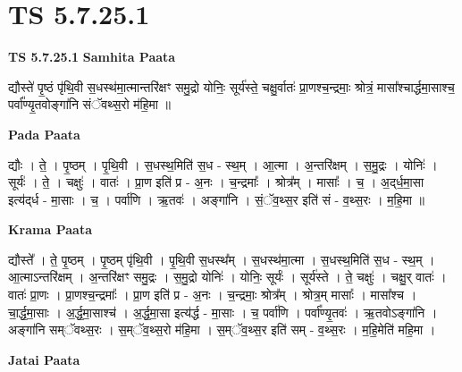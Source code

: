 \documentclass[17pt]{extarticle}
\begin{document}
\section{ TS 5.7.25.1 }

\textbf{TS 5.7.25.1 } \newline
\textbf{Samhita Paata} \newline

द्यौस्ते॑ पृ॒ष्ठं पृ॑थि॒वी स॒धस्थ॑मा॒त्मान्तरि॑क्षꣳ समु॒द्रो योनिः॒ सूर्य॑स्ते॒ चक्षु॒र्वातः॑ प्रा॒णश्च॒न्द्रमाः॒ श्रोत्रं॒ मासा᳚श्चार्द्धमा॒साश्च॒ पर्वा᳚ण्यृ॒तवोङ्गा॑नि संॅवथ्स॒रो म॑हि॒मा ॥ \newline

\textbf{Pada Paata} \newline

द्यौः । ते॒ । पृ॒ष्ठम् । पृ॒थि॒वी । स॒धस्थ॒मिति॑ स॒ध - स्थ॒म् । आ॒त्मा । अ॒न्तरि॑क्षम् । स॒मु॒द्रः । योनिः॑ । सूर्यः॑ । ते॒ । चक्षुः॑ । वातः॑ । प्रा॒ण इति॑ प्र - अ॒नः । च॒न्द्रमाः᳚ । श्रोत्र᳚म् । मासाः᳚ । च॒ । अ॒द्‌र्ध॒मा॒सा इत्य॑द्‌र्ध - मा॒साः । च॒ । पर्वा॑णि । ऋ॒तवः॑ । अङ्गा॑नि । सं॒ॅव॒थ्स॒र इति॑ सं - व॒थ्स॒रः । म॒हि॒मा ॥  \newline


\textbf{Krama Paata} \newline

द्यौस्ते᳚ । ते॒ पृ॒ष्ठम् । पृ॒ष्ठम् पृ॑थि॒वी । पृ॒थि॒वी स॒धस्थ᳚म् । स॒धस्थ॑मा॒त्मा । स॒धस्थ॒मिति॑ स॒ध - स्थ॒म् । आ॒त्माऽन्तरि॑क्षम् । अ॒न्तरि॑क्षꣳ समु॒द्रः । स॒मु॒द्रो योनिः॑ । योनिः॒ सूर्यः॑ । सूर्य॑स्ते । ते॒ चक्षुः॑ । चक्षु॒र् वातः॑ । वातः॑ प्रा॒णः । प्रा॒णश्च॒न्द्रमाः᳚ । प्रा॒ण इति॑ प्र - अ॒नः । च॒न्द्रमाः॒ श्रोत्र᳚म् । श्रोत्र॒म् मासाः᳚ । मासा᳚श्च । चा॒र्द्ध॒मा॒साः । अ॒र्द्ध॒मा॒साश्च॑ । अ॒र्द्ध॒मा॒सा इत्य॑र्द्ध - मा॒साः । च॒ पर्वा॑णि । पर्वा᳚ण्यृ॒तवः॑ । ऋ॒तवोऽङ्गा॑नि । अङ्गा॑नि सम्ॅवथ्स॒रः । स॒म्ॅव॒थ्स॒रो म॑हि॒मा । स॒म्ॅव॒थ्स॒र इति॑ सम् - व॒थ्स॒रः । म॒हि॒मेति॑ महि॒मा । \newline

\textbf{Jatai Paata} \newline
\end{document}
